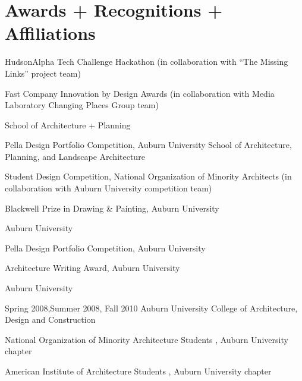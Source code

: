 \documentclass[letterpaper, oneside, 10pt]{article}
\begin{document}
\section*{Awards + Recognitions + Affiliations} %

\DotSep{0.25em}
HudsonAlpha Tech Challenge Hackathon (in collaboration with ``The Missing
Links'' project team)

\DotSep{0.25em} Fast Company Innovation
by Design Awards (in collaboration with  Media Laboratory Changing
Places Group team)

\DotSep{0.25em}  School of
Architecture + Planning 

\DotSep{0.25em} Pella Design Portfolio
Competition, Auburn University School of Architecture, Planning, and Landscape
Architecture 

\DotSep{0.25em} Student Design Competition,
National Organization of Minority Architects (in collaboration with Auburn
University  competition team)

\DotSep{0.25em} Blackwell Prize in Drawing \&
Painting, Auburn University 

\DotSep{0.25em} Auburn University 

\DotSep{0.25em} Pella Design Portfolio
Competition, Auburn University 

\DotSep{0.25em} Architecture Writing Award, Auburn
University 

\DotSep{0.25em}
Auburn University 

\hfill
\vspace{-15pt}

\DotSep{0.25em} Spring 2008,\enspace Summer 2008,\enspace
Fall 2010\DotSep{0.25em} Auburn University College of Architecture, Design and
Construction 

\DotSep{0.25em} National Organization of Minority
Architecture Students , Auburn University chapter

\DotSep{0.25em}
American Institute of Architecture Students , Auburn University
chapter
\end{document}
